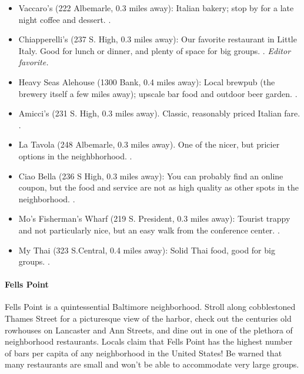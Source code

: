 \begin{itemize}
\item{Vaccaro's (222 Albemarle, 0.3 miles away): Italian bakery; stop by for a late night coffee and dessert. \gradstudent.}
\item{Chiapperelli's (237 S. High, 0.3 miles away): Our favorite restaurant in Little Italy. Good for lunch or dinner, and plenty of space for big groups. \postdoc. \it{Editor favorite}.}
\item{Heavy Seas Alehouse (1300 Bank, 0.4 miles away): Local brewpub (the brewery itself a few miles away); upscale bar food and outdoor beer garden. \professor.}
\item{Amicci's (231 S. High, 0.3 miles away). Classic, reasonably priced Italian fare. \postdoc.}
\item{La Tavola (248 Albemarle, 0.3 miles away). One of the nicer, but pricier options in the neighbhorhood. \professor.}
\item{Ciao Bella (236 S High, 0.3 miles away): You can probably find an online coupon, but the food and service are not as high quality as other spots in the neighborhood. \postdoc.}
\item{Mo's Fisherman's Wharf (219 S. President, 0.3 miles away): Tourist trappy and not particularly nice, but an easy walk from the conference center. \postdoc.}
\item{My Thai (323 S.Central, 0.4 miles away): Solid Thai food, good for big groups. \postdoc.}
\end{itemize}

\paragraph*{Fells Point}
Fells Point is a quintessential Baltimore neighborhood. Stroll along cobblestoned Thames Street for a picturesque view of the harbor, check out the centuries old rowhouses on Lancaster and Ann Streets, and dine out in one of the plethora of neighborhood restaurants. Locals claim that Fells Point has the highest number of bars per capita of any neighborhood in the United States! Be warned that many restaurants are small and won't be able to accommodate very large groups.

